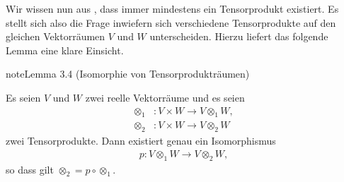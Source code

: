 \documentclass[letterpaper,10pt,german]{jupyterBook}
\begin{document}
\sphinxAtStartPar
Wir wissen nun aus {\hyperref[\detokenize{vektoranalysis/tensor:thm:existenzTensorprodukt}]{}}, dass immer mindestens ein Tensorprodukt existiert.
Es stellt sich also die Frage inwiefern sich verschiedene Tensorprodukte auf den gleichen Vektorräumen \(V\) und \(W\) unterscheiden.
Hierzu liefert das folgende Lemma eine klare Einsicht.
\label{vektoranalysis/tensor:lem:isomorphismusTensorproduktraum}
\begin{sphinxadmonition}{note}{Lemma 3.4 (Isomorphie von Tensorprodukträumen)}



\sphinxAtStartPar
Es seien \(V\) und \(W\) zwei reelle Vektorräume und es seien
\begin{equation*}
\begin{split}\otimes_1 &\colon V \times W \rightarrow V \otimes_1 W,\\
\otimes_2 &\colon V \times W \rightarrow V \otimes_2 W\end{split}
\end{equation*}
\sphinxAtStartPar
zwei Tensorprodukte.
Dann existiert genau ein Isomorphismus
\begin{equation*}
\begin{split}p: V\otimes_1 W \to V\otimes_2 W,\end{split}
\end{equation*}
\sphinxAtStartPar
so dass gilt \(\otimes_2 = p\circ \otimes_1\).
\end{sphinxadmonition}
\end{document}
